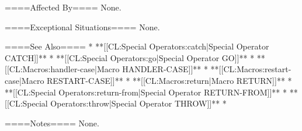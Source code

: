 ====Affected By====
None.

====Exceptional Situations====
None.

====See Also====
  * **[[CL:Special Operators:catch|Special Operator CATCH]]**
  * **[[CL:Special Operators:go|Special Operator GO]]**
  * **[[CL:Macros:handler-case|Macro HANDLER-CASE]]**
  * **[[CL:Macros:restart-case|Macro RESTART-CASE]]**
  * **[[CL:Macros:return|Macro RETURN]]**
  * **[[CL:Special Operators:return-from|Special Operator RETURN-FROM]]**
  * **[[CL:Special Operators:throw|Special Operator THROW]]**
  * {\secref\Evaluation}

====Notes====
None.

 
